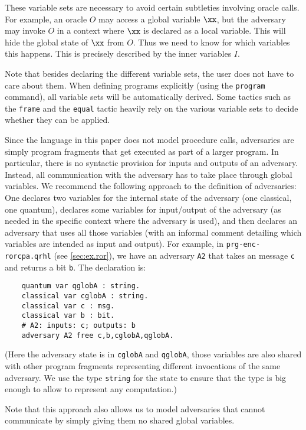 \documentclass{article}
\begin{document}
These variable sets are necessary to avoid certain subtleties
involving oracle calls. For example, an oracle $O$ may access a global
variable $\xx$, but the adversary may invoke $O$ in a context where
$\xx$ is declared as a local variable. This will hide the global state
of $\xx$ from $O$. Thus we need to know for which variables this
happens. This is precisely described by the inner variables $I$.

Note that besides declaring the different variable sets, the user does
not have to care about them. When defining programs explicitly (using
the \texttt{program} command), all variable sets will be automatically
derived. Some tactics such as the \texttt{frame} and the
\texttt{equal} tactic heavily rely on the various variable sets to
decide whether they can be applied.

Since the language in this paper does not model procedure calls,
adversaries are simply program fragments that get executed as part of
a larger program. In particular, there is no syntactic provision for
inputs and outputs of an adversary. Instead, all communication with
the adversary has to take place through global variables. We recommend
the following approach to the definition of adversaries: One declares
two variables for the internal state of the adversary (one classical,
one quantum), declares some variables for input/output of the
adversary (as needed in the specific context where the adversary is
used), and then declares an adversary that uses all those variables
(with an informal comment detailing which variables are intended as input and
output). For example, in \texttt{prg-enc-rorcpa.qrhl} (see \autoref{sec:ex.ror}), we have an
adversary \texttt{A2} that takes an message \texttt{c} and returns
a bit \texttt{b}. The declaration is:
\begin{center}
  \begin{lstlisting}
    quantum var qglobA : string.
    classical var cglobA : string.
    classical var c : msg.
    classical var b : bit.
    # A2: inputs: c; outputs: b
    adversary A2 free c,b,cglobA,qglobA.
  \end{lstlisting}
\end{center}
(Here the adversary state is in \texttt{cglobA} and \texttt{qglobA},
those variables are also shared with other program fragments
representing different invocations of the same adversary. We use the
type \texttt{string} for the state to ensure that the type is big enough to allow to represent any computation.)

Note that this approach also allows us to model adversaries that
cannot communicate by simply giving them no shared global variables.
\end{document}
